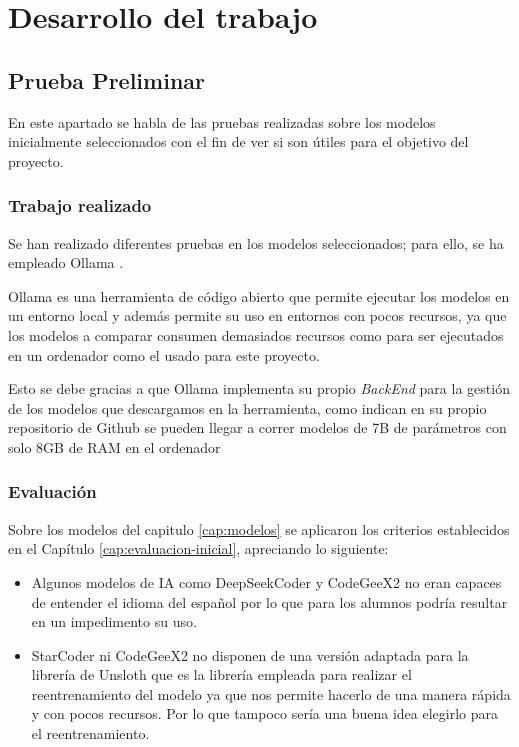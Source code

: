 \part{Desarrollo del trabajo}

\chapter{Prueba Preliminar}

En este apartado se habla de las pruebas realizadas sobre los modelos inicialmente seleccionados con el fin de ver si son útiles para el objetivo del proyecto.

\section{Trabajo realizado}
Se han realizado diferentes  pruebas en los modelos seleccionados; para ello, se ha empleado Ollama \cite{Ollama}.

Ollama \cite{Ollama} es una herramienta de código abierto que permite ejecutar los modelos en un entorno local y además permite su uso en entornos con pocos recursos, ya que los modelos a comparar consumen demasiados recursos como para ser ejecutados en un ordenador como el usado para este proyecto.

Esto se debe gracias a que Ollama implementa su propio \textit{BackEnd} para la gestión de los modelos que descargamos en la herramienta, como indican en su propio repositorio de Github se pueden llegar a correr modelos de 7B de parámetros con solo 8GB de RAM en el ordenador \cite{GithubOllama} \cite{InformacionOllama}

\section{Evaluación}

Sobre los modelos del capitulo \ref{cap:modelos} se aplicaron los criterios establecidos en el Capítulo \ref{cap:evaluacion-inicial}, apreciando lo siguiente:

\begin{itemize}
    \item Algunos modelos de IA como DeepSeekCoder y CodeGeeX2 no eran capaces de entender el idioma del español por lo que para los alumnos podría resultar en un impedimento su uso.
    \item StarCoder ni CodeGeeX2 no disponen de una versión adaptada para la librería de Unsloth \cite{Unsloth} que es la librería empleada para realizar el reentrenamiento del modelo ya que nos permite hacerlo de una manera rápida y con pocos recursos. Por lo que tampoco sería una buena idea elegirlo para el reentrenamiento.
\end{itemize}

